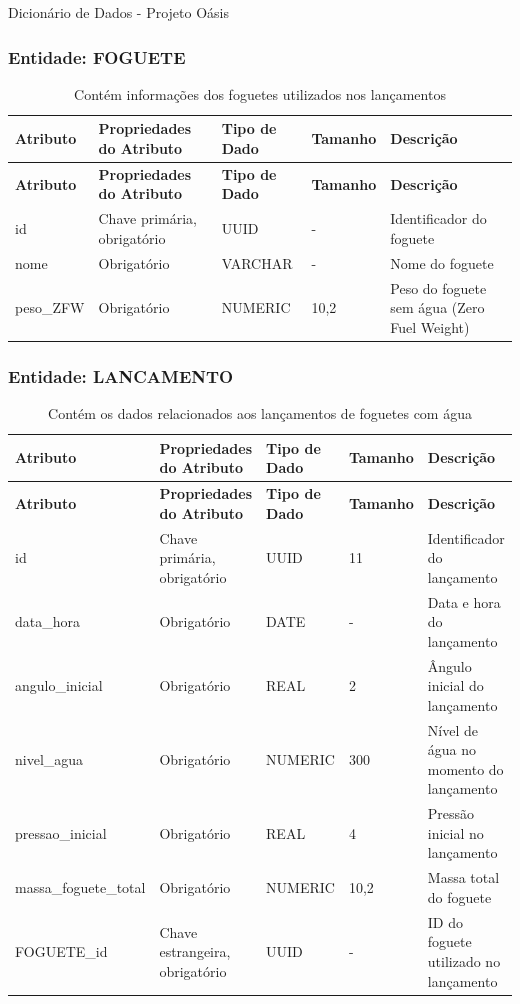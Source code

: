 \renewcommand{\arraystretch}{1.2}

Dicionário de Dados - Projeto Oásis

\subsubsection*{Entidade: FOGUETE}    

\begin{longtable}{|p{2.5cm}|p{3.5cm}|p{2cm}|p{1.8cm}|p{4cm}|}
\caption{Contém informações dos foguetes utilizados nos lançamentos}
\hline
\textbf{Atributo} & \textbf{Propriedades do Atributo} & \textbf{Tipo de Dado} & \textbf{Tamanho} & \textbf{Descrição} \\
\hline
\endfirsthead

\hline
\textbf{Atributo} & \textbf{Propriedades do Atributo} & \textbf{Tipo de Dado} & \textbf{Tamanho} & \textbf{Descrição} \\
\hline
\endhead

id & Chave primária, obrigatório & UUID & - & Identificador do foguete \\
\hline
nome & Obrigatório & VARCHAR & - & Nome do foguete \\
\hline
peso\_ZFW & Obrigatório & NUMERIC & 10,2 & Peso do foguete sem água (Zero Fuel Weight) \\
\hline
\end{longtable}

\subsubsection*{Entidade: LANCAMENTO}    

\begin{longtable}{|p{3.7cm}|p{2.7cm}|p{2cm}|p{1.8cm}|p{4cm}|}
\caption{Contém os dados relacionados aos lançamentos de foguetes com água}
\hline
\textbf{Atributo} & \textbf{Propriedades do Atributo} & \textbf{Tipo de Dado} & \textbf{Tamanho} & \textbf{Descrição} \\
\hline
\endfirsthead

\hline
\textbf{Atributo} & \textbf{Propriedades do Atributo} & \textbf{Tipo de Dado} & \textbf{Tamanho} & \textbf{Descrição} \\
\hline
\endhead

id & Chave primária, obrigatório & UUID & 11 & Identificador do lançamento \\
\hline
data\_hora & Obrigatório & DATE & - & Data e hora do lançamento \\
\hline
angulo\_inicial & Obrigatório & REAL & 2 & Ângulo inicial do lançamento \\
\hline
nivel\_agua & Obrigatório & NUMERIC & 300 & Nível de água no momento do lançamento \\
\hline
pressao\_inicial & Obrigatório & REAL & 4 & Pressão inicial no lançamento \\
\hline
massa\_foguete\_total & Obrigatório & NUMERIC & 10,2 & Massa total do foguete \\
\hline
FOGUETE\_id & Chave estrangeira, obrigatório & UUID & - & ID do foguete utilizado no lançamento \\
\hline
\end{longtable}

